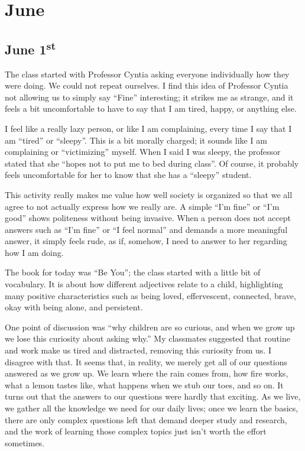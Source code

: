 \chapter{June}

\section[June 1st]{June 1\textsuperscript{st}}
The class started with Professor Cyntia asking everyone individually how they were doing. We could not repeat ourselves. I find this idea of Professor Cyntia not allowing us to simply say ``Fine'' interesting; it strikes me as strange, and it feels a bit uncomfortable to have to say that I am tired, happy, or anything else.

I feel like a really lazy person, or like I am complaining, every time I say that I am ``tired'' or ``sleepy''. This is a bit morally charged; it sounds like I am complaining or ``victimizing'' myself. When I said I was sleepy, the professor stated that she ``hopes not to put me to bed during class''. Of course, it probably feels uncomfortable for her to know that she has a ``sleepy'' student.

This activity really makes me value how well society is organized so that we all agree to not actually express how we really are. A simple ``I'm fine'' or ``I'm good'' shows politeness without being invasive. When a person does not accept answers such as ``I'm fine'' or ``I feel normal'' and demands a more meaningful answer, it simply feels rude, as if, somehow, I need to answer to her regarding how I am doing.

The book for today was ``Be You''; the class started with a little bit of vocabulary. It is about how different adjectives relate to a child, highlighting many positive characteristics such as being loved, effervescent, connected, brave, okay with being alone, and persistent.

One point of discussion was ``why children are so curious, and when we grow up we lose this curiosity about asking why.'' My classmates suggested that routine and work make us tired and distracted, removing this curiosity from us. I disagree with that. It seems that, in reality, we merely get all of our questions answered as we grow up. We learn where the rain comes from, how fire works, what a lemon tastes like, what happens when we stub our toes, and so on. It turns out that the answers to our questions were hardly that exciting. As we live, we gather all the knowledge we need for our daily lives; once we learn the basics, there are only complex questions left that demand deeper study and research, and the work of learning those complex topics just isn't worth the effort sometimes.

